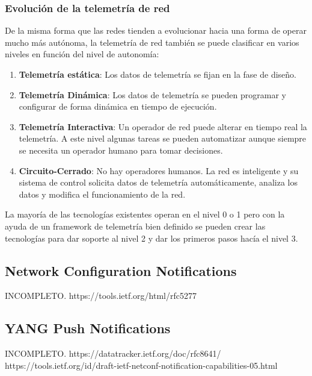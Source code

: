 \subsubsection{Evolución de la telemetría de red}
De la misma forma que las redes tienden a evolucionar hacia una forma de operar mucho más autónoma, la telemetría de red también se puede clasificar en varios niveles en función del nivel de autonomía:
\begin{enumerate}[label=Nivel \arabic*, leftmargin=4\parindent]
    \setcounter{enumi}{0}
    \item \textbf{Telemetría estática}: Los datos de telemetría se fijan en la fase de diseño.
    \item \textbf{Telemetría Dinámica}: Los datos de telemetría se pueden programar y configurar de forma dinámica en tiempo de ejecución.
    \item \textbf{Telemetría Interactiva}: Un operador de red puede alterar en tiempo real la telemetría. A este nivel algunas tareas se pueden automatizar aunque siempre se necesita un operador humano para tomar decisiones.
    \item \textbf{Circuito-Cerrado}: No hay operadores humanos. La red es inteligente y su sistema de control solicita datos de telemetría automáticamente, analiza los datos y modifica el funcionamiento de la red.
\end{enumerate}

La mayoría de las tecnologías existentes operan en el nivel 0 o 1 pero con la ayuda de un framework de telemetría bien definido se pueden crear las tecnologías para dar soporte al nivel 2 y dar los primeros pasos hacía el nivel 3.



\subsection{Network Configuration Notifications\label{sec:NETCONFNot}}
\Large{INCOMPLETO.}
https://tools.ietf.org/html/rfc5277

\subsection{YANG Push Notifications\label{sec:YANGNot}}
\Large{INCOMPLETO.}
https://datatracker.ietf.org/doc/rfc8641/
https://tools.ietf.org/id/draft-ietf-netconf-notification-capabilities-05.html